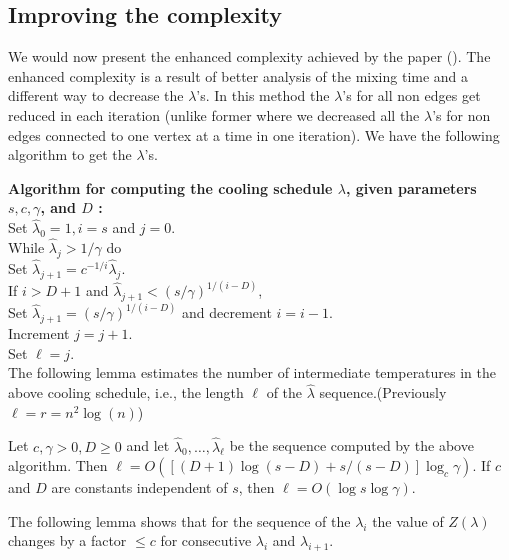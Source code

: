\subsection{Improving the complexity}
We would now present the enhanced complexity achieved by the paper (). The enhanced complexity is a result of better analysis of the mixing time and a different way to decrease the $\lambda$'s. In this method the $\lambda$'s for all non edges get reduced in each iteration (unlike former where we decreased all the $\lambda$'s for non edges connected to one vertex at a time in  one iteration). We have the following algorithm to get the $\lambda$'s.
\begin{flushleft}
	\textbf{Algorithm for computing the cooling schedule $\lambda$, given parameters $s, c, \gamma$, and $D$ :}\\\vspace{3mm}
	Set $\hat{\lambda}_0=1, i=s$ and $j=0$.\\
	While $\hat{\lambda}_j>1 / \gamma$ do\\
	\hspace{10mm}Set $\hat{\lambda}_{j+1}=c^{-1 / i} \hat{\lambda}_j$.\\
	\hspace{10mm}If $i>D+1$ and $\hat{\lambda}_{j+1}<(s / \gamma)^{1 /(i-D)}$,\\
	\hspace{15mm}Set $\hat{\lambda}_{j+1}=(s / \gamma)^{1 /(i-D)}$ and decrement $i=i-1$.\\
	\hspace{10mm}Increment $j=j+1$.\\
	Set $\ell=j$.\\
	
	The following lemma estimates the number of intermediate temperatures in the above cooling schedule, i.e., the length $\ell$ of the $\hat{\lambda}$ sequence.(Previously $\ell=r=n^2\log(n)$)
	
	\begin{lemma}
		
	 Let $c, \gamma>0, D \geq 0$ and let $\hat{\lambda}_0, \ldots, \hat{\lambda}_{\ell}$ be the sequence computed by the above algorithm. Then $\ell=O\left([(D+1) \log (s-D)+s /(s-D)] \log _c \gamma\right)$. If $c$ and $D$ are constants independent of $s$, then $\ell=O(\log s \log \gamma)$.
	\end{lemma}
	
	The following lemma shows that for the sequence of the $\lambda_i$ the value of $Z(\lambda)$ changes by a factor $\leq c$ for consecutive $\lambda_i$ and $\lambda_{i+1}$. 
	

\end{flushleft}
